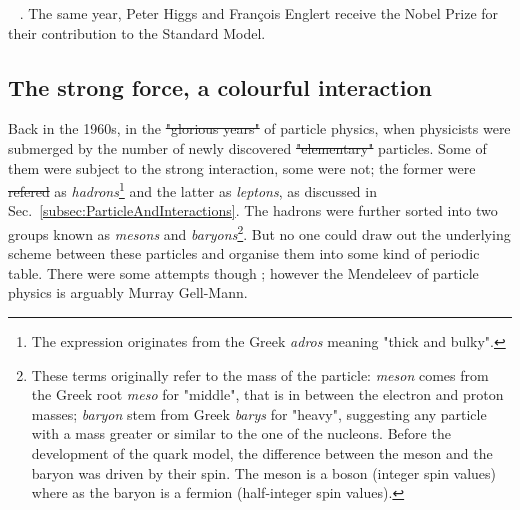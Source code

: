 \documentclass[ALICE,manyauthors]{cernphprep}
\newcommand{\Sec}       {\textsc{S}ec.~}
\providecommand{\DIFaddtex}[1]{{\protect\color{blue}\uwave{#1}}} %
\providecommand{\DIFdeltex}[1]{{\protect\color{red}\sout{#1}}}                      %
\providecommand{\DIFaddbegin}{} %
\providecommand{\DIFaddend}{} %
\providecommand{\DIFdelbegin}{} %
\providecommand{\DIFdelend}{} %
\providecommand{\DIFadd}[1]{\texorpdfstring{\DIFaddtex{#1}}{#1}} %
\providecommand{\DIFdel}[1]{\texorpdfstring{\DIFdeltex{#1}}{}} %
\newcommand{\DIFscaledelfig}{0.5}
\newlength{\DIFdelgraphicswidth} %
\newlength{\DIFdelgraphicsheight} %
\newcommand{\DIFaddincludegraphics}[2][]{{\color{blue}\fbox{\DIFOincludegraphics[#1]{#2}}}} %
\newcommand{\DIFdelincludegraphics}[2][]{%
\sbox{\DIFdelgraphicsbox}{\DIFOincludegraphics[#1]{#2}}%
\settoboxwidth{\DIFdelgraphicswidth}{\DIFdelgraphicsbox} %
\settoboxtotalheight{\DIFdelgraphicsheight}{\DIFdelgraphicsbox} %
\scalebox{\DIFscaledelfig}{%
\parbox[b]{\DIFdelgraphicswidth}{\usebox{\DIFdelgraphicsbox}\\[-\baselineskip] \rule{\DIFdelgraphicswidth}{0em}}\llap{\resizebox{\DIFdelgraphicswidth}{\DIFdelgraphicsheight}{%
\setlength{\unitlength}{\DIFdelgraphicswidth}%
\begin{picture}(1,1)%
\thicklines\linethickness{2pt} %
{\color[rgb]{1,0,0}\put(0,0){\framebox(1,1){}}}%
{\color[rgb]{1,0,0}\put(0,0){\line( 1,1){1}}}%
{\color[rgb]{1,0,0}\put(0,1){\line(1,-1){1}}}%
\end{picture}%
}\hspace*{3pt}}} %
} %
\DeclareRobustCommand{\DIFaddbegin}{\DIFOaddbegin \let\includegraphics\DIFaddincludegraphics} %
\DeclareRobustCommand{\DIFaddend}{\DIFOaddend \let\includegraphics\DIFOincludegraphics} %
\DeclareRobustCommand{\DIFdelbegin}{\DIFOdelbegin \let\includegraphics\DIFdelincludegraphics} %
\DeclareRobustCommand{\DIFdelend}{\DIFOaddend \let\includegraphics\DIFOincludegraphics} %
\begin{document}
{{\cite{cernNewResultsIndicate2023}}\hspace{0pt}%
\mbox{%
\cite{kibbleEnglertBroutHiggsGuralnikHagenKibbleMechanismHistory2009}}\hspace{0pt}%
}\DIFaddend . The same year, Peter Higgs and François Englert receive the Nobel Prize for their contribution to the Standard Model.


\subsection{The strong force, a colourful interaction}
\label{subsec:strongforce}

Back in the 1960s, in the \DIFdelbegin \DIFdel{"glorious years" }\DIFdelend \DIFaddbegin {} \DIFaddend of particle physics, when physicists were submerged by the number of newly discovered \DIFdelbegin \DIFdel{"elementary" }\DIFdelend \DIFaddbegin {} \DIFaddend particles. Some of them were subject to the strong interaction, some were not; the former were \DIFdelbegin \DIFdel{refered }\DIFdelend \DIFaddbegin \DIFadd{referred }\DIFaddend as \textit{hadrons}\footnote{The expression originates from the Greek \textit{adros} meaning "thick and bulky".} and the latter as \textit{leptons}, as discussed in \Sec\ref{subsec:ParticleAndInteractions}. The hadrons were further sorted into two groups known as \textit{mesons} and \textit{baryons}\footnote{These terms originally refer to the mass of the particle: \textit{meson} comes from the Greek root \textit{meso} for "middle", that is in between the electron and proton masses; \textit{baryon} stem from Greek \textit{barys} for "heavy", suggesting any particle with a mass greater or similar to the one of the nucleons. Before the development of the quark model, the difference between the meson and the baryon was driven by their spin. The meson is a boson (integer spin values) where as the baryon is a fermion (half-integer spin values)\cite{s.glashowInteractionsJourneyMind1990}.}. But no one could draw out the underlying scheme between these particles and organise them into some kind of periodic table. There were some attempts though \cite{sakataCompositeModelNew1956}\cite{sakuraiTheoryStrongInteractions1960}; however the Mendeleev of particle physics is arguably Murray Gell-Mann. 
\end{document}
